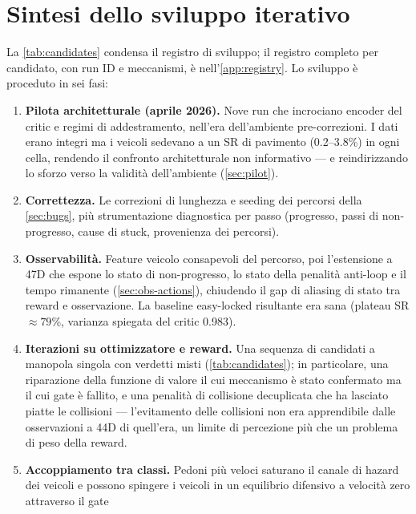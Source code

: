 \section{Sintesi dello sviluppo iterativo}
\label{sec:iterations}

La \cref{tab:candidates} condensa il registro di sviluppo; il registro
completo per candidato, con run ID e meccanismi, è
nell'\cref{app:registry}. Lo sviluppo è proceduto in sei fasi:

\begin{enumerate}
  \item \textbf{Pilota architetturale (aprile 2026).} Nove run che
        incrociano encoder del critic e regimi di addestramento,
        nell'era dell'ambiente pre-correzioni. I dati erano integri ma i
        veicoli sedevano a un SR di pavimento (0.2--3.8\%) in ogni
        cella, rendendo il confronto architetturale non informativo ---
        e reindirizzando lo sforzo verso la validità dell'ambiente
        (\cref{sec:pilot}).
  \item \textbf{Correttezza.} Le correzioni di lunghezza e seeding dei
        percorsi della \cref{sec:bugs}, più strumentazione diagnostica
        per passo (progresso, passi di non-progresso, cause di stuck,
        provenienza dei percorsi).
  \item \textbf{Osservabilità.} Feature veicolo consapevoli del
        percorso, poi l'estensione a 47D che espone lo stato di
        non-progresso, lo stato della penalità anti-loop e il tempo
        rimanente (\cref{sec:obs-actions}), chiudendo il gap di
        aliasing di stato tra reward e osservazione. La baseline
        easy-locked risultante era sana (plateau SR $\approx 79$\%,
        varianza spiegata del critic 0.983).
  \item \textbf{Iterazioni su ottimizzatore e reward.} Una sequenza di
        candidati a manopola singola con verdetti misti
        (\cref{tab:candidates}); in particolare, una riparazione della
        funzione di valore il cui meccanismo è stato confermato ma il
        cui gate è fallito, e una penalità di collisione decuplicata che
        ha lasciato piatte le collisioni --- l'evitamento delle
        collisioni non era apprendibile dalle osservazioni a 44D di
        quell'era, un limite di percezione più che un problema di peso
        della reward.
  \item \textbf{Accoppiamento tra classi.} Pedoni più veloci saturano il
        canale di hazard dei veicoli e possono spingere i veicoli in un
        equilibrio difensivo a velocità zero attraverso il gate

\end{enumerate}
